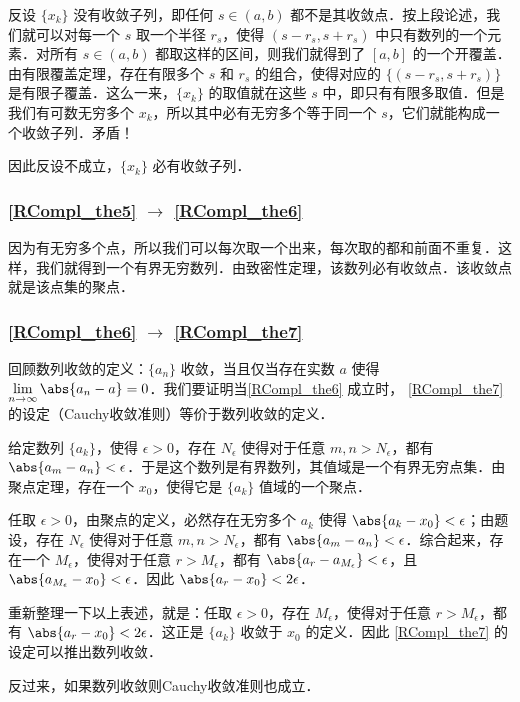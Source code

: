 反设 $\{x_k\}$ 没有收敛子列，即任何 $s\in(a, b)$ 都不是其收敛点．按上段论述，我们就可以对每一个 $s$ 取一个半径 $r_s$，使得 $(s-r_s, s+r_s)$ 中只有数列的一个元素．对所有 $s\in(a, b)$ 都取这样的区间，则我们就得到了 $[a, b]$ 的一个开覆盖．由有限覆盖定理，存在有限多个 $s$ 和 $r_s$ 的组合，使得对应的 $\{(s-r_s, s+r_s)\}$ 是有限子覆盖．这么一来，$\{x_k\}$ 的取值就在这些 $s$ 中，即只有有限多取值．但是我们有可数无穷多个 $x_k$，所以其中必有无穷多个等于同一个 $s$，它们就能构成一个收敛子列．矛盾！

因此反设不成立，$\{x_k\}$ 必有收敛子列．

\subsubsection{\autoref{RCompl_the5} $\to$ \autoref{RCompl_the6} }

因为有无穷多个点，所以我们可以每次取一个出来，每次取的都和前面不重复．这样，我们就得到一个有界无穷数列．由致密性定理，该数列必有收敛点．该收敛点就是该点集的聚点．



\subsubsection{\autoref{RCompl_the6} $\to$ \autoref{RCompl_the7} }

回顾数列收敛的定义：$\{a_n\}$ 收敛，当且仅当存在实数 $a$ 使得 $\lim\limits_{n\to \infty}\abs{a_n-a}=0$．我们要证明当\autoref{RCompl_the6} 成立时， \autoref{RCompl_the7} 的设定（Cauchy收敛准则）等价于数列收敛的定义．

给定数列 $\{a_k\}$，使得 $\epsilon>0$，存在 $N_\epsilon$ 使得对于任意 $m, n>N_\epsilon$，都有 $\abs{a_m-a_n}<\epsilon$．于是这个数列是有界数列，其值域是一个有界无穷点集．由聚点定理，存在一个 $x_0$，使得它是 $\{a_k\}$ 值域的一个聚点．

任取 $\epsilon>0$，由聚点的定义，必然存在无穷多个 $a_k$ 使得 $\abs{a_k-x_0}<\epsilon$；由题设，存在 $N_\epsilon$ 使得对于任意 $m, n>N_\epsilon$，都有 $\abs{a_m-a_n}<\epsilon$．综合起来，存在一个 $M_\epsilon$，使得对于任意 $r>M_\epsilon$，都有 $\abs{a_r-a_{M_\epsilon}}<\epsilon$，且 $\abs{a_{M_\epsilon}-x_0}<\epsilon$．因此 $\abs{a_r-x_0}<2\epsilon$．

重新整理一下以上表述，就是：任取 $\epsilon>0$，存在 $M_\epsilon$，使得对于任意 $r>M_\epsilon$，都有 $\abs{a_r-x_0}<2\epsilon$．这正是 $\{a_k\}$ 收敛于 $x_0$ 的定义．因此 \autoref{RCompl_the7} 的设定可以推出数列收敛．

反过来，如果数列收敛则Cauchy收敛准则也成立．


